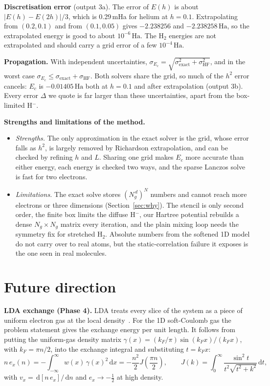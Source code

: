 \documentclass[11pt,a4paper]{article}
\newcommand{\dd}{\,\mathrm{d}}
\newcommand{\Ha}{\ensuremath{\,\mathrm{Ha}}}
\begin{document}
\textbf{Discretisation error} (output 3a). The error of $E(h)$ is about $|E(h)-E(2h)|/3$, which is 0.29\,mHa for helium at
$h=0.1$. Extrapolating from $(0.2,0.1)$ and from $(0.1,0.05)$ gives $-2.238256$ and $-2.238258$\Ha, so the extrapolated
energy is good to about $10^{-6}$\Ha. The H$_2$ energies are not extrapolated and should carry a grid error of a few
$10^{-4}$\Ha.

\textbf{Propagation.} With independent uncertainties, $\sigma_{E_c}=\sqrt{\sigma_\text{exact}^2+\sigma_\text{HF}^2}$, and in the worst case
$\sigma_{E_c}\le\sigma_\text{exact}+\sigma_\text{HF}$. Both solvers share the grid, so much of the $h^2$ error cancels: $E_c$ is $-0.01405$\Ha{} both
at $h=0.1$ and after extrapolation (output 3b). Every error $\Delta$ we quote is far larger than these
uncertainties, apart from the box-limited H$^-$.

\textbf{Strengths and limitations of the method.}
\begin{itemize}
  \item \emph{Strengths.} The only approximation in the exact solver is the grid, whose error falls as $h^2$, is
        largely removed by Richardson extrapolation, and can be checked by refining $h$ and $L$. Sharing one grid makes
        $E_c$ more accurate than either energy, each energy is checked two ways, and the sparse Lanczos solve is fast
        for two electrons.
  \item \emph{Limitations.} The exact solve stores $(N_g^{\,d})^N$ numbers and cannot reach more electrons or three
        dimensions (Section~\ref{sec:why}). The stencil is only second order, the finite box limits the diffuse H$^-$,
        our Hartree potential rebuilds a dense $N_g\times N_g$ matrix every iteration, and the plain mixing loop needs
        the symmetry fix for stretched H$_2$. Absolute numbers from the softened 1D model do not carry over to real
        atoms, but the static-correlation failure it exposes is the one seen in real molecules.
\end{itemize}

\section{Future direction}\label{sec:future}

\textbf{LDA exchange (Phase 4).} LDA treats every slice of the system as a piece of uniform electron gas at the
local density~\cite{capelle,harrison}. For the 1D soft-Coulomb gas the problem statement gives the exchange energy
per unit length. It follows from putting the uniform-gas density matrix $\gamma(x)=(k_F/\pi)\sin(k_Fx)/(k_Fx)$, with
$k_F=\pi n/2$, into the exchange integral and substituting $t=k_Fx$:
\begin{equation}
  n\,e_x(n)=-\int_{-\infty}^{\infty}w(x)\,\gamma(x)^2\dd x=-\frac{n^2}{2}J\!\left(\frac{\pi n}{2}\right),\qquad
  J(k)=\int_0^\infty\frac{\sin^2t}{t^2\sqrt{t^2+k^2}}\dd t,
\end{equation}
with $v_x=\dd[n\,e_x]/\dd n$ and $e_x\to-\tfrac12$ at high density.
\end{document}
